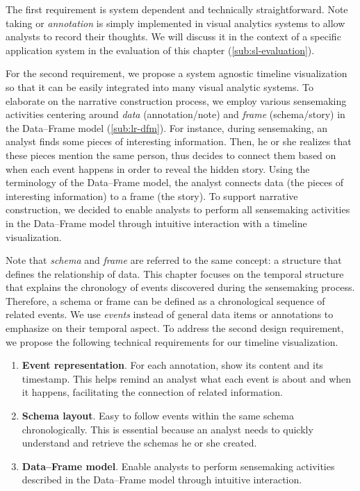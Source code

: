 The first requirement is system dependent and technically straightforward. Note taking or \emph{annotation} is simply implemented in visual analytics systems to allow analysts to record their thoughts. We will discuss it in the context of a specific application system in the evaluation of this chapter (\autoref{sub:sl-evaluation}).

For the second requirement, we propose a system agnostic timeline visualization so that it can be easily integrated into many visual analytic systems. To elaborate on the narrative construction process, we employ various sensemaking activities centering around \emph{data} (annotation/note) and \emph{frame} (schema/story) in the Data--Frame model (\autoref{sub:lr-dfm}). For instance, during sensemaking, an analyst finds some pieces of interesting information. Then, he or she realizes that these pieces mention the same person, thus decides to connect them based on when each event happens in order to reveal the hidden story. Using the terminology of the Data--Frame model, the analyst connects data (the pieces of interesting information) to a frame (the story). To support narrative construction, we decided to enable analysts to perform all sensemaking activities in the Data--Frame model through intuitive interaction with a timeline visualization. 

Note that \emph{schema} and \emph{frame} are referred to the same concept: a structure that defines the relationship of data. This chapter focuses on the temporal structure that explains the chronology of events discovered during the sensemaking process. Therefore, a schema or frame can be defined as a chronological sequence of related events. We use \emph{events} instead of general data items or annotations to emphasize on their temporal aspect. To address the second design requirement, we propose the following technical requirements for our timeline visualization.

\begin{enumerate}
	\item \textbf{Event representation}. For each annotation, show its content and its timestamp. This helps remind an analyst what each event is about and when it happens, facilitating the connection of related information.
	\item \textbf{Schema layout}. Easy to follow events within the same schema chronologically. This is essential because an analyst needs to quickly understand and retrieve the schemas he or she created.
	\item \textbf{Data--Frame model}. Enable analysts to perform sensemaking activities described in the Data--Frame model through intuitive interaction.
\end{enumerate}